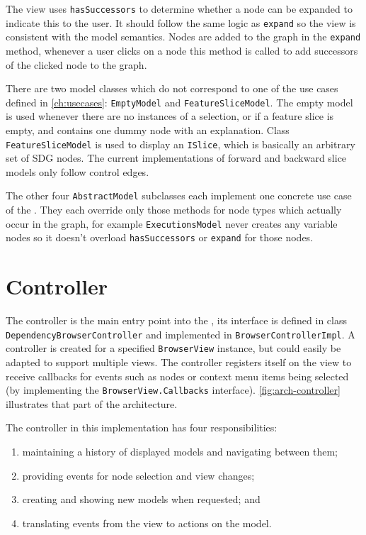 The view uses \lstinline|hasSuccessors| to determine whether a node can be expanded to indicate this to the user. It 
should follow the same logic as \lstinline|expand| so the view is consistent with the model semantics. Nodes are added 
to the graph in the \lstinline|expand| method, whenever a user clicks on a node this method is called to add successors 
of the clicked node to the graph.

There are two model classes which do not correspond to one of the use cases defined in \autoref{ch:usecases}: 
\lstinline|EmptyModel| and \lstinline|FeatureSliceModel|. The empty model is used whenever there are no instances of a 
selection, or if a feature slice is empty, and contains one dummy node with an explanation. Class 
\lstinline|FeatureSliceModel| is used to display an \lstinline|ISlice|, which is basically an arbitrary set of SDG 
nodes. The current implementations of forward and backward slice models only follow control edges.


The other four \lstinline|AbstractModel| subclasses each implement one concrete use case of the \SB. They each override 
only those methods for node types which actually occur in the graph, for example \lstinline|ExecutionsModel| never 
creates any variable nodes so it doesn't overload \lstinline|hasSuccessors| or \lstinline|expand| for those nodes.


\section{Controller}

The controller is the main entry point into the \SB, its interface is defined in class 
\lstinline|DependencyBrowserController| and implemented in \lstinline|BrowserControllerImpl|. A controller is created 
for a specified \lstinline|BrowserView| instance, but could easily be adapted to support multiple views. The controller 
registers itself on the view to receive callbacks for events such as nodes or context menu items being selected (by 
implementing the \lstinline|BrowserView.Callbacks| interface). \autoref{fig:arch-controller} illustrates that part of 
the architecture.

The controller in this implementation has four responsibilities:
\begin{enumerate}
  \item maintaining a history of displayed models and navigating between them;
  \item providing events for node selection and view changes;
  \item creating and showing new models when requested; and
  \item translating events from the view to actions on the model.
\end{enumerate}

